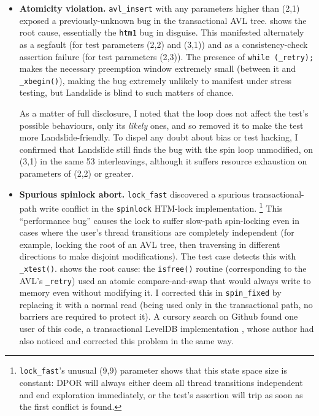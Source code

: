 \begin{itemize}
	\item
	{\bf Atomicity violation.}
	{\tt avl\_insert} with any parameters higher than (2,1)
	exposed a previously-unknown bug in the transactional AVL tree.
	 shows the root cause, essentially the {\tt htm1} bug in disguise.
	This manifested
	alternately
	as a segfault (for test parameters (2,2) and (3,1))
	and
	as a consistency-check assertion failure (for test parameters (2,3)).
	The presence of {\tt while (\_retry);} makes the necessary preemption window extremely small
	(between it and {\tt \_xbegin()}),
	making the bug extremely unlikely to manifest under stress testing,
	but Landslide is blind to such matters of chance.

	As a matter of full disclosure,
	I noted that the loop does not affect the test's possible behaviours,
	only its {\em likely} ones,
	and so removed it to make the test more Landslide-friendly.
	To dispel any doubt about bias or test hacking,
	I confirmed that Landslide still finds the bug with the spin loop unmodified,
	on (3,1) in the same 53 interleavings,
	although it suffers resource exhaustion
	on parameters of (2,2) or greater.
	\item
	{\bf Spurious spinlock abort.}
	{\tt lock\_fast} discovered a spurious transactional-path write conflict
	in the {\tt spinlock} HTM-lock implementation.%
	\footnote{{\tt lock\_fast}'s unusual (9,9) parameter shows that this state space size is constant: %
	DPOR will always either deem all thread transitions independent and end exploration immediately,
	or the test's assertion will trip as soon as the first conflict is found.}
	This ``performance bug'' causes the lock to suffer slow-path spin-locking
	even in cases where the user's thread transitions are completely independent
	(for example, locking the root of an AVL tree,
	then traversing in different directions to make disjoint modifications).
	The test case detects this with {\tt \_xtest()}.
	 shows the root cause:
	the {\tt isfree()} routine (corresponding to the AVL's {\tt \_retry})
	used an atomic compare-and-swap that would always write to memory even without modifying it.
	I corrected this in
	{\tt spin\_fixed}
	by replacing it
	with a normal read
	(being used only in the transactional path, no barriers are required to protect it).
	A cursory search on Github found one user of this code,
	a transactional LevelDB implementation \cite{htm-leveldb-github},
	whose author had also noticed and corrected this problem in the same way.


\end{itemize}
